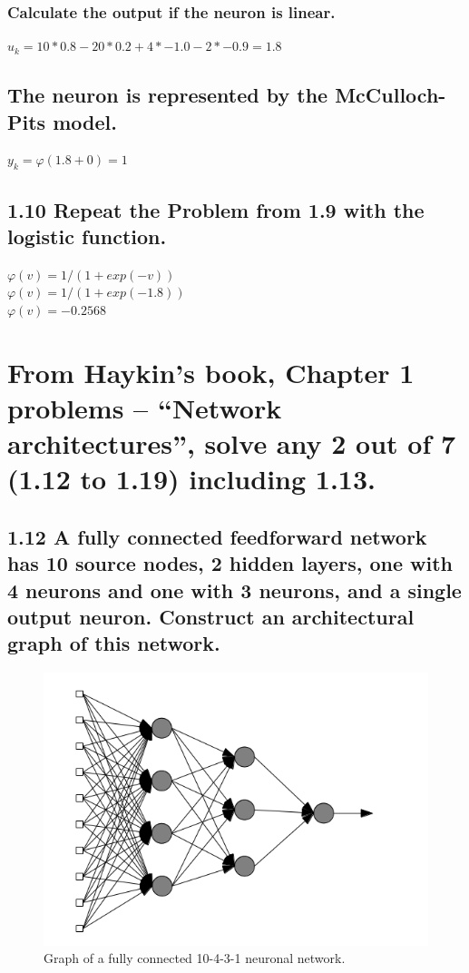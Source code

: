 \documentclass{scrartcl}
\begin{document}
\subsubsection{Calculate the output if the neuron is linear.}
$u_{k}=10*0.8-20*0.2+4*-1.0-2*-0.9=1.8$\\

\subsection{The neuron is represented by the McCulloch-Pits model.}
$y_{k}=\varphi(1.8+0)=1$\\

\subsection{1.10 Repeat the Problem from 1.9 with the logistic function.}
$\varphi (v)=1/(1+exp(-v))$\\
$\varphi (v)=1/(1+exp(-1.8))$\\
$\varphi (v)= -0.2568$

\section{From Haykin’s book, Chapter 1 problems – “Network architectures”, solve any 2 out of 7
(1.12 to 1.19) including 1.13.
}
\subsection{1.12 A fully connected feedforward network has 10 source nodes, 2 hidden layers, one with 4 neurons and one with 3 neurons, and a single output neuron. Construct an architectural graph of this network.}

\begin{figure}[p, b]
 \center
 \includegraphics[width= \textwidth]{10-4-3-1-NN.png}
 \caption{Graph of a fully connected 10-4-3-1 neuronal network.}
 \label{fig:graph}
\end{figure}
\end{document}
